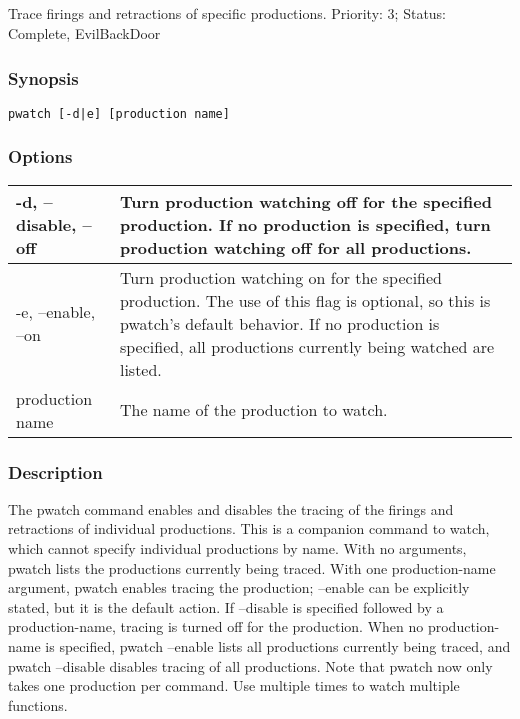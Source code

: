 \subsection{}
\label{pwatch}
Trace firings and retractions of specific productions. 
 Priority: 3; Status: Complete, EvilBackDoor
\subsubsection*{Synopsis}
\begin{verbatim}
pwatch [-d|e] [production name]
\end{verbatim}
\subsubsection*{Options}
\begin{tabular}{|l|l|}
\hline 
 -d, --disable, --off  & Turn production watching off for the specified production. If no production is specified, turn production watching off for all productions.  \\
 \hline 
 -e, --enable, --on  & Turn production watching on for the specified production. The use of this flag is optional, so this is pwatch's default behavior. If no production is specified, all productions currently being watched are listed.  \\
 \hline 
production name & The name of the production to watch.  \\
 \hline 
\end{tabular}
\subsubsection*{Description}
 The pwatch command enables and disables the tracing of the firings and retractions of individual productions. This is a companion command to watch, which cannot specify individual productions by name. 
 With no arguments, pwatch lists the productions currently being traced. With one production-name argument, pwatch enables tracing the production; --enable can be explicitly stated, but it is the default action. 
 If --disable is specified followed by a production-name, tracing is turned off for the production. When no production-name is specified, pwatch --enable lists all productions currently being traced, and pwatch --disable disables tracing of all productions. 
 Note that pwatch now only takes one production per command. Use multiple times to watch multiple functions. 
